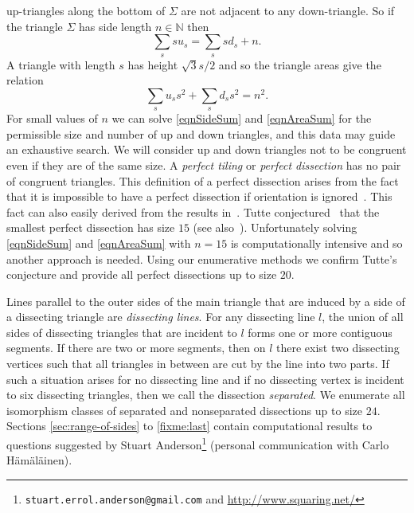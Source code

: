 \documentclass[12pt,amstags,fleqn]{article}
\theoremstyle{plain}
\theoremstyle{definition}
\begin{document}
up-triangles along the bottom of $\Sigma$ are not adjacent to any
down-triangle. So if the triangle $\Sigma$ has side length $n \in
\mathbb{N}$ then
\begin{equation}\label{eqnSideSum}
\sum_{s} s u_{s} = \sum_{s} s d_{s} + n.
\end{equation}
A triangle with length ${s}$ has height $\sqrt{3}{s}/2$ and so 
the triangle areas give the relation
\begin{equation}\label{eqnAreaSum}
\sum_s u_s s^2 + \sum_s d_s s^2 = n^2.
\end{equation}
For small values of $n$ we can solve \eqref{eqnSideSum} and \eqref{eqnAreaSum}
for the permissible
size and number of up and down triangles, and this data may guide an
exhaustive search.
We will consider up and down triangles not to be congruent even
if they are of the same size. A {\em perfect tiling} or
{\em perfect dissection} has no pair of congruent triangles.
This definition of a perfect dissection arises from the fact that 
it is impossible to have a perfect dissection if orientation is
ignored~\cite{MR0003040}. This fact can also easily derived from the
results in~\cite{aleshamming}.
Tutte conjectured~\cite{MR0003040,MR0027521} that the smallest perfect
dissection has size $15$ (see also~\cite{squaring}).  Unfortunately
solving \eqref{eqnSideSum} and \eqref{eqnAreaSum} with $n = 15$ is computationally intensive and so
another approach is needed.  Using our enumerative methods we confirm Tutte's
conjecture and provide all perfect dissections up to size $20$. 


Lines parallel to the outer sides of the main triangle
that are induced by a side
of a dissecting triangle are \emph{dissecting lines}.
For any dissecting line $l$,
the union of all sides of dissecting triangles
that are incident to $l$ forms
one or more contiguous segments. If there are two or more segments,
then on $l$ there exist
two dissecting vertices such that all
triangles in between are cut by the line into two parts. If such
a situation arises for no dissecting line and if no
dissecting vertex is incident to six dissecting triangles,
then we call the dissection {\em separated}.
We enumerate all isomorphism classes of 
separated and nonseparated dissections up to size $24$.
Sections \ref{sec:range-of-sides} to \ref{fixme:last} contain computational results to questions suggested
by Stuart Anderson\footnote{\texttt{stuart.errol.anderson@gmail.com} and
\url{http://www.squaring.net/}} (personal communication with Carlo H\"{a}m\"{a}l\"{a}inen).
\end{document}
